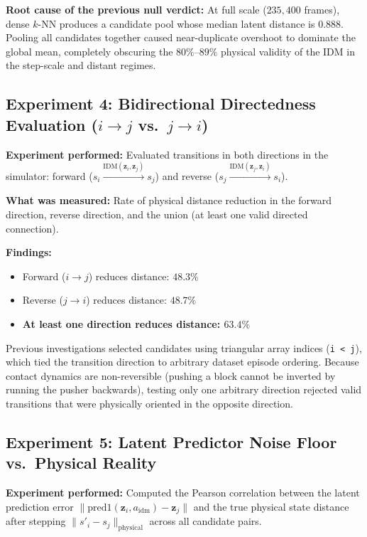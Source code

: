 \documentclass[11pt]{article}
\newcommand{\zv}{\mathbf{z}}
\begin{document}
\textbf{Root cause of the previous null verdict:} At full scale ($235{,}400$ frames), dense $k$-NN produces a candidate
pool whose median latent distance is $0.888$. Pooling all candidates together caused near-duplicate overshoot to dominate
the global mean, completely obscuring the $80\%$--$89\%$ physical validity of the IDM in the step-scale and distant regimes.

\subsection{Experiment 4: Bidirectional Directedness Evaluation \texorpdfstring{($i \to j$ vs.\ $j \to i$)}{(i -> j vs j -> i)}}
\label{sec:exp4-bidirectional}

\textbf{Experiment performed:} Evaluated transitions in both directions in the simulator:
forward ($s_i \xrightarrow{\mathrm{IDM}(\zv_i, \zv_j)} s_j$) and
reverse ($s_j \xrightarrow{\mathrm{IDM}(\zv_j, \zv_i)} s_i$).

\textbf{What was measured:} Rate of physical distance reduction in the forward direction, reverse direction,
and the union (at least one valid directed connection).

\textbf{Findings:}
\begin{itemize}[leftmargin=1.4em,itemsep=2pt]
\item Forward ($i \to j$) reduces distance: $48.3\%$
\item Reverse ($j \to i$) reduces distance: $48.7\%$
\item \textbf{At least one direction reduces distance: $63.4\%$}
\end{itemize}
Previous investigations selected candidates using triangular array indices (\texttt{i < j}), which tied the transition
direction to arbitrary dataset episode ordering. Because contact dynamics are non-reversible (pushing a block cannot be
inverted by running the pusher backwards), testing only one arbitrary direction rejected valid transitions that were
physically oriented in the opposite direction.

\subsection{Experiment 5: Latent Predictor Noise Floor vs.\ Physical Reality}
\label{sec:exp5-noise-floor}

\textbf{Experiment performed:} Computed the Pearson correlation between the latent prediction error
$\|\mathrm{pred1}(\zv_i, a_{\mathrm{idm}}) - \zv_j\|$ and the true physical state distance after stepping
$\|s'_i - s_j\|_{\mathrm{physical}}$ across all candidate pairs.
\end{document}
